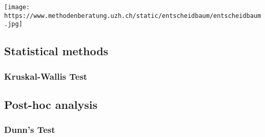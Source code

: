 \documentclass[
]{article}
\begin{document}
\texttt{[image: https://www.methodenberatung.uzh.ch/static/entscheidbaum/entscheidbaum.jpg]}

\subsection{Statistical methods}\label{statistical-methods}

\subsubsection{Kruskal-Wallis Test}\label{kruskal-wallis-test}

\subsection{Post-hoc analysis}\label{post-hoc-analysis}

\subsubsection{Dunn's Test}\label{dunns-test}
\end{document}
